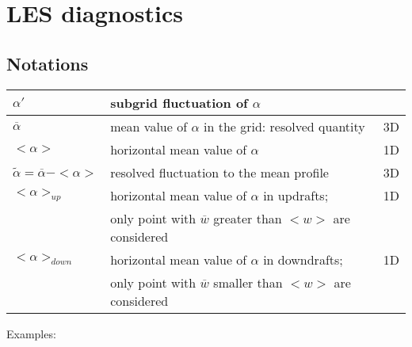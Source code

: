 \chapter{LES diagnostics} \label{s:LESdiag}

\section{Notations}

\begin{center}
\begin{tabular}{|l|l|l|}
\hline
$\alpha'$ & subgrid fluctuation of $\alpha$ &  \\
\hline
$\overline{\alpha}$ & mean value of $\alpha$ in the grid: resolved quantity & 3D \\
\hline
$<\alpha>$ &  horizontal mean value of $\alpha$ & 1D\\
\hline
$\tilde{\alpha} = \overline{\alpha}-<\alpha>$ &  resolved fluctuation 
to the mean profile & 3D\\
\hline
$<\alpha>_{up}$ &  horizontal mean value of $\alpha$ in updrafts;& 1D \\
& only point with $\overline{w}$ greater than $<w>$ are considered &\\
\hline
$<\alpha>_{down}$ &  horizontal mean value of $\alpha$ in downdrafts;& 1D \\
& only point with $\overline{w}$ smaller than $<w>$ are considered& \\
\hline
\end{tabular}
\end{center}


Examples:



